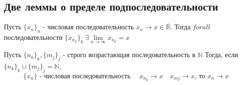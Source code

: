 \documentclass{article}
\begin{document}
\subsection{Две леммы о пределе подпоследовательности}
 Пусть $\{x_n\}_n$ - числовая последовательность $x_n \to x \in \overline{\mathbb{R}}$.
Тогда $forall$ последовательности $\{x_{n_k}\}_k\ \exists \lim\limits_{n \to  \infty}x_{n_k} = x$

 Пусть $\{n_k\}_k, \{m_j\}_j$ - строго возрастающая последовательность в $\mathbb{N}$
Тогда, если $\{n_k\}_k \cup \{m_j\}_j = \mathbb{N}$,
\begin{equation*}
	\{x_n\} \text{ - числовая последовательность }\quad x_{n_k} \to x \quad x_{mj} \to x \text{, то } x_n \to x
\end{equation*}
\end{document}
